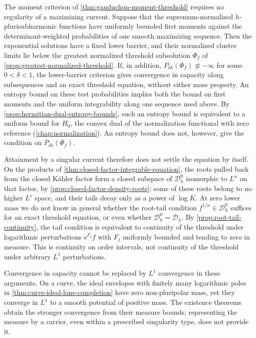 The moment criterion of \cref{thm:gauduchon-moment-threshold} requires no regularity of a maximizing current. Suppose that the supremum-normalized $h$-plurisubharmonic functions have uniformly bounded first moments against the determinant-weighted probabilities of one smooth maximizing sequence. Then the exponential solutions have a fixed lower barrier, and their normalized cluster limits lie below the greatest normalized threshold subsolution $\Phi_f$ of \cref{prop:greatest-normalized-threshold}. If, in addition, $P_{\delta h}(\Phi_f)\not\equiv-\infty$ for some $0<\delta<1$, the lower-barrier criterion gives convergence in capacity along subsequences and an exact threshold equation, without either mass property. An entropy bound on these test probabilities implies both the bound on first moments and the uniform integrability along one sequence used above. By \cref{prop:hermitian-dual-entropy-bounds}, such an entropy bound is equivalent to a uniform bound for $H_0$, the convex dual of the normalization functional with zero reference (\cref{chap:normalization}). An entropy bound does not, however, give the condition on $P_{\delta h}(\Phi_f)$.

Attainment by a singular current therefore does not settle the equation by itself. On the products of \cref{thm:closed-factor-integrable-equation}, the roots pulled back from the closed K\"ahler factor form a closed subspace of $\mathcal D_h^0$ isomorphic to $L^n$ on that factor, by \cref{prop:closed-factor-density-roots}; some of these roots belong to no higher $L^r$ space, and their tails decay only as a power of $\log K$. At zero lower mass we do not know in general whether the root-tail condition $f^{1/n}\in\mathcal D_h^0$ suffices for an exact threshold equation, or even whether $\mathcal D_h^0=\mathcal D_h$. By \cref{prop:root-tail-continuity}, the tail condition is equivalent to continuity of the threshold under logarithmic perturbations $\mathrm{e}^{F_j}f$ with $F_j$ uniformly bounded and tending to zero in measure. This is continuity on order intervals, not continuity of the threshold under arbitrary $L^1$ perturbations.

Convergence in capacity cannot be replaced by $L^1$ convergence in these arguments. On a curve, the ideal envelopes with finitely many logarithmic poles in \cref{thm:curve-ideal-lone-completion} have zero non-pluripolar mass, yet they converge in $L^1$ to a smooth potential of positive mass. The existence theorems obtain the stronger convergence from their measure bounds; representing the measure by a carrier, even within a prescribed singularity type, does not provide it.

